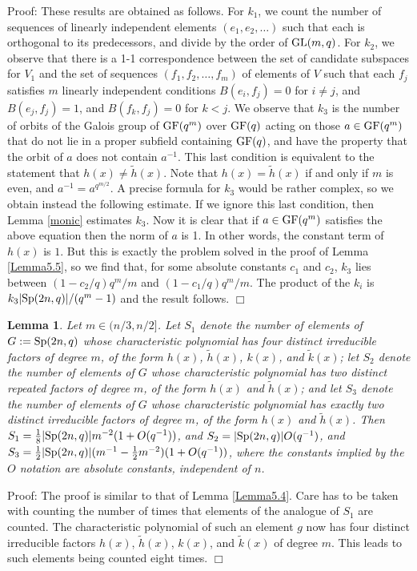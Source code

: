 \documentclass[12pt]{article}
\newtheorem{lemma}[definition]{Lemma}
\newenvironment{proof}{\normalsize {\sc Proof}:}{{\hfill $\Box$ \\}}
\def\GL{{\rm GL}}
\def\GF{{\rm GF}}
\def\Sp{{\rm Sp}}
\begin{document}
\begin{proof}
These results are obtained as follows. For $k_1$, we count the number of
sequences of linearly  independent  elements $(e_1,e_2,\ldots)$  such
that each is orthogonal to its predecessors, and divide by the order
of $\GL(m,q)$. For $k_2$, we observe that there is a 1-1
correspondence between the set of candidate subspaces for $V_1$ and
the set of sequences $(f_1,f_2,\ldots,f_m)$ of elements of $V$ such that
each $f_j$ satisfies $m$ linearly independent conditions
$B(e_i,f_j)=0$ for $i \ne j$, and 
$B(e_j,f_j)=1$, and $B(f_k,f_j)=0$ for $k < j$.
We observe that $k_3$ is the number of orbits of the Galois group of
$\GF(q^m)$ over $\GF(q)$ acting on those $a \in \GF(q^m)$ that 
do not lie
in a proper subfield containing $\GF(q)$, and have the property that 
the orbit of $a$ does not contain $a^{-1}$.  This last condition is 
equivalent to the statement that $h(x)\ne \tilde{h}(x)$.   
Note that $h(x)=\tilde{h}(x)$ if and only if
$m$ is even, and $a^{-1}=a^{q^{m/2}}$.
A precise formula for $k_3$
would be rather complex, so we obtain instead the following
estimate. If we ignore this last condition, then
Lemma \ref{monic} estimates $k_3$.
Now it is clear that if $a\in\GF(q^m)$ satisfies the
above equation then the norm of $a$ is 1. In other words, the
constant term of $h(x)$ is $1$. But this is exactly the problem solved in
the proof of Lemma \ref{Lemma5.5}, so we find that, for some
absolute constants $c_1$ and $c_2$, $k_3$ lies between $(1-c_2 /q)q^m/m$ and
$(1-c_1 /q)q^m/m$.  The product of the $k_i$ is
$k_3\vert\Sp(2n,q)\vert/(q^m-1)$ and the result follows. 
\end{proof}

\begin{lemma}\label{Lemma5.9} Let $m\in(n/3,n/2]$. 
Let $S_1$ denote the number of elements of $G:=\Sp(2n,q)$ whose characteristic 
polynomial
has four distinct irreducible factors of degree $m$, of the 
form $h(x)$, $\tilde h(x)$,
$k(x)$, and $\tilde k(x)$;
 let $S_2$ denote the number
of elements of $G$ whose characteristic polynomial has two distinct 
repeated factors of degree $m$, of the form $h(x)$ and $\tilde h(x)$; and 
let $S_3$ denote the number 
of elements of $G$ whose characteristic
polynomial has exactly two distinct irreducible factors of degree $m$,
of the form $h(x)$ and $\tilde h(x)$. 
Then $S_1={1\over8}\vert\Sp(2n,q)\vert m^{-2}(1+O(q^{-1}))$, and 
$S_2=\vert\Sp(2n,q)\vert O(q^{-1})$, 
and $S_3={1\over2}\vert\Sp(2n,q)\vert(m^{-1}-{1\over2}m^{-2})(1+O(q^{-1}))$,
where the constants implied by the $O$ notation are absolute constants,
independent of $n$.
\end{lemma}
\begin{proof} 
The proof is similar to that of Lemma \ref{Lemma5.4}.  Care has to
be taken with counting the number of times that elements of the analogue
of $S_1$ are counted.  The characteristic polynomial of such an element
$g$ now has four distinct irreducible factors $h(x)$, $\tilde h(x)$, $k(x)$,
and $\tilde k(x)$ of degree $m$.  This leads to such elements being counted 
eight times.
\end{proof}
\end{document}
